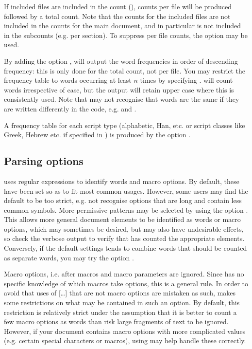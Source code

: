 \documentclass{article}
\begin{document}
If included files are included in the count (), counts per file will be produced followed by a total count. Note that the counts for the included files are not included in the counts for the main document, and in particular is not included in the subcounts (e.g. per section). To suppress per file counts, the option  may be used.

By adding the option , \TeXcount{} will output the word frequencies in order of descending frequency: this is only done for the total count, not per file. You may restrict the frequency table to words occurring at least $n$ times by specifying . \TeXcount{} will count words irrespective of case, but the output will retain upper case where this is consistently used. Note that \TeXcount{} may not recognise that words are the same if they are written differently in the code, e.g.  and .

A frequency table for each script type (alphabetic, Han, etc. or script classes like Greek, Hebrew etc. if specified in ) is produced by the option . 

\subsection{Parsing options}

\TeXcount{} uses regular expressions to identify words and macro options. By default, these have been set so as to fit most common usages. However, some users may find the default to be too strict, e.g. not recognise options that are long and contain less common symbols. More permissive patterns may be selected by using the option . This allows more general document elements to be identified as words or macro options, which may sometimes be desired, but may also have undesirable effects, so check the verbose output to verify that \TeXcount{} has counted the appropriate elements. Conversely, if the default settings tends to combine words that should be counted as separate words, you may try the option . 

Macro options, i.e. \code{[\ldots]} after macros and macro parameters are ignored. Since \TeXcount{} has no specific knowledge of which macros take options, this is a general rule. In order to avoid that uses of [\ldots] that are not macro options are mistaken as such, \TeXcount{} makes some restrictions on what may be contained in such an option. By default, this restriction is relatively strict under the assumption that it is better to count a few macro options as words than risk large fragments of text to be ignored. However, if your document contains macro options with more complicated values (e.g. certain special characters or macros), using  may help handle these correctly.
\end{document}
